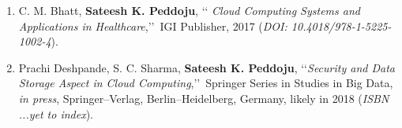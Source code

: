 \begin{enumerate}[label=(B\arabic*).]
	
	\item%
	C. M. Bhatt, \textbf{Sateesh K. Peddoju}, \lq\lq
	\emph{Cloud Computing Systems and Applications in Healthcare},\rq\rq\, IGI Publisher, 2017
	(\emph{DOI: 10.4018/978-1-5225-1002-4}).
	
	\item%
	Prachi Deshpande, S. C. Sharma, \textbf{Sateesh K. Peddoju},
	\lq\lq \emph{Security and Data Storage Aspect in Cloud Computing},\rq\rq\, Springer Series in
	Studies in Big Data, \textit{in press}, Springer--Verlag, Berlin--Heidelberg,
	Germany, likely in 2018 (\emph{ISBN ...yet to index}).

\end{enumerate}
